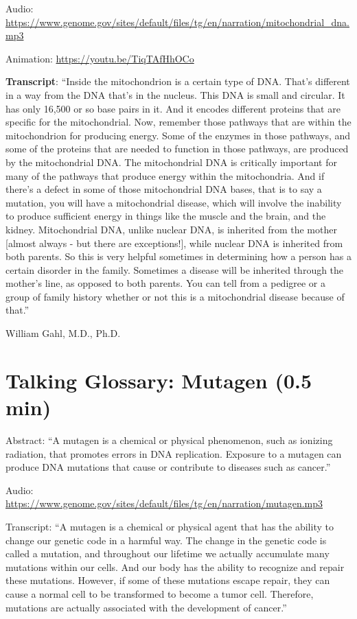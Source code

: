 \documentclass[
]{book}
\begin{document}
Audio: \url{https://www.genome.gov/sites/default/files/tg/en/narration/mitochondrial_dna.mp3}

Animation: \url{https://youtu.be/TiqTAfHhOCo}

\textbf{Transcript}: ``Inside the mitochondrion is a certain type of DNA. That's different in a way from the DNA that's in the nucleus. This DNA is small and circular. It has only 16,500 or so base pairs in it. And it encodes different proteins that are specific for the mitochondrial. Now, remember those pathways that are within the mitochondrion for producing energy. Some of the enzymes in those pathways, and some of the proteins that are needed to function in those pathways, are produced by the mitochondrial DNA. The mitochondrial DNA is critically important for many of the pathways that produce energy within the mitochondria. And if there's a defect in some of those mitochondrial DNA bases, that is to say a mutation, you will have a mitochondrial disease, which will involve the inability to produce sufficient energy in things like the muscle and the brain, and the kidney. Mitochondrial DNA, unlike nuclear DNA, is inherited from the mother {[}almost always - but there are exceptions!{]}, while nuclear DNA is inherited from both parents. So this is very helpful sometimes in determining how a person has a certain disorder in the family. Sometimes a disease will be inherited through the mother's line, as opposed to both parents. You can tell from a pedigree or a group of family history whether or not this is a mitochondrial disease because of that.''

William Gahl, M.D., Ph.D.

\hypertarget{talking-glossary-mutagen-0.5-min}{%
\section{Talking Glossary: Mutagen (0.5 min)}\label{talking-glossary-mutagen-0.5-min}}

Abstract: ``A mutagen is a chemical or physical phenomenon, such as ionizing radiation, that promotes errors in DNA replication. Exposure to a mutagen can produce DNA mutations that cause or contribute to diseases such as cancer.''

Audio: \url{https://www.genome.gov/sites/default/files/tg/en/narration/mutagen.mp3}

Transcript: ``A mutagen is a chemical or physical agent that has the ability to change our genetic code in a harmful way. The change in the genetic code is called a mutation, and throughout our lifetime we actually accumulate many mutations within our cells. And our body has the ability to recognize and repair these mutations. However, if some of these mutations escape repair, they can cause a normal cell to be transformed to become a tumor cell. Therefore, mutations are actually associated with the development of cancer.''
\end{document}
